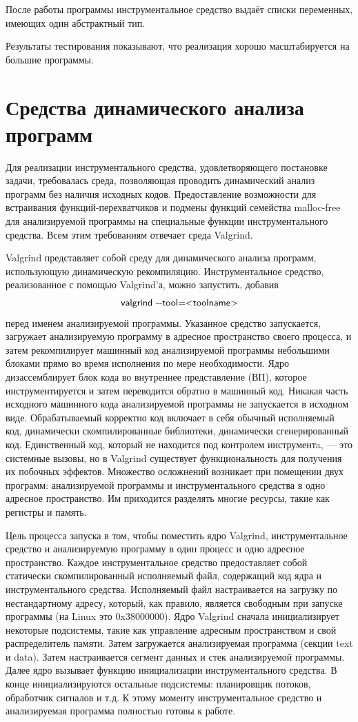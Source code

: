 \documentclass[a4paper,12pt,russian]{article}
\newcommand{\code}[1]{\textsf{#1}}
\begin{document}
После работы программы инструментальное средство выдаёт списки переменных, имеющих один абстрактный тип.

Результаты тестирования показывают, что реализация хорошо масштабируется на большие программы.

\newpage
\section{Средства динамического анализа программ}
\label{valgrind_section}
Для реализации инструментального средства, удовлетворяющего постановке задачи, требовалась среда, позволяющая проводить динамический анализ программ без наличия исходных кодов.
Предоставление возможности для встраивания функций-перехватчиков и подмены функций семейства \code{malloc-free} для анализируемой программы на специальные функции инструментального средства.
Всем этим требованиям отвечает среда \code{Valgrind}.

\code{Valgrind} представляет собой среду для динамического анализа программ, использующую динамическую рекомпиляцию.
Инструментальное средство, реализованное с помощью \code{Valgrind}'а, можно запустить, добавив \[\mbox{\code{valgrind -{}-tool=<toolname>}}\] перед именем анализируемой программы. Указанное средство запускается, загружает анализируемую программу в адресное пространство своего процесса, и затем рекомпилирует машинный код анализируемой программы небольшими блоками прямо во время исполнения по мере необходимости.
Ядро дизассемблирует блок кода во внутреннее представление (ВП), которое инструментируется и затем переводится обратно в машинный код.
Никакая часть исходного машинного кода анализируемой программы не запускается в исходном виде. Обрабатываемый корректно код включает в себя обычный исполняемый код, динамически скомпилированные библиотеки, динамически сгенерированный код. Единственный код, который не находится под контролем инструментa, --- это системные вызовы, но в \code{Valgrind} существует функциональность для получения их побочных эффектов. Множество осложнений возникает при помещении двух программ: анализируемой программы и инструментального средства в одно адресное пространство. Им приходится разделять многие ресурсы, такие как регистры и память.

Цель процесса запуска в том, чтобы поместить ядро \code{Valgrind}, инструментальное средство и анализируемую программу в один процесс и одно адресное пространство. Каждое инструментальное средство предоставляет собой статически скомпилированный исполняемый файл, содержащий код ядра и инструментального средства. Исполняемый файл настраивается на загрузку по нестандартному адресу, который, как правило, является свободным при запуске программы (на Linux это \code{0x38000000}). Ядро \code{Valgrind} сначала инициализирует некоторые подсистемы, такие как управление адресным пространством и свой распределитель памяти. Затем загружается анализируемая программа (секции \code{text} и \code{data}). Затем настраивается сегмент данных и стек анализируемой программы. Далее ядро вызывает функцию инициализации инструментального средства. В конце инициализируются остальные подсистемы: планировщик потоков, обработчик сигналов и т.д. К этому моменту инструментальное средство и анализируемая программа полностью готовы к работе.
\end{document}
